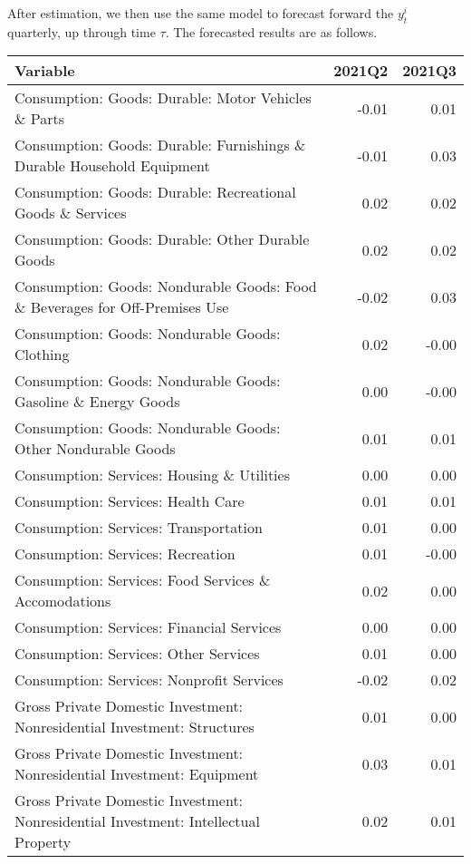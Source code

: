 \documentclass[11pt, letterpaper]{article}\usepackage[]{graphicx}\usepackage[]{color}
\begin{document}
After estimation, we then use the same model to forecast forward the $y^i_t$ quarterly, up through time $\tau$. 
The forecasted results are as follows.
\begin{table}[H]
\centering
\begingroup\scriptsize
\begin{tabular}{lrr}
  \hline
Variable & 2021Q2 & 2021Q3 \\ 
  \hline
Consumption: Goods: Durable: Motor Vehicles \& Parts & -0.01 & 0.01 \\ 
  Consumption: Goods: Durable: Furnishings \& Durable Household Equipment & -0.01 & 0.03 \\ 
  Consumption: Goods: Durable: Recreational Goods \& Services & 0.02 & 0.02 \\ 
  Consumption: Goods: Durable: Other Durable Goods & 0.02 & 0.02 \\ 
  Consumption: Goods: Nondurable Goods: Food \& Beverages for Off-Premises Use & -0.02 & 0.03 \\ 
  Consumption: Goods: Nondurable Goods: Clothing & 0.02 & -0.00 \\ 
  Consumption: Goods: Nondurable Goods: Gasoline \& Energy Goods & 0.00 & -0.00 \\ 
  Consumption: Goods: Nondurable Goods: Other Nondurable Goods & 0.01 & 0.01 \\ 
  Consumption: Services: Housing \& Utilities & 0.00 & 0.00 \\ 
  Consumption: Services: Health Care & 0.01 & 0.01 \\ 
  Consumption: Services: Transportation & 0.01 & 0.00 \\ 
  Consumption: Services: Recreation & 0.01 & -0.00 \\ 
  Consumption: Services: Food Services \& Accomodations & 0.02 & 0.00 \\ 
  Consumption: Services: Financial Services & 0.00 & 0.00 \\ 
  Consumption: Services: Other Services & 0.01 & 0.00 \\ 
  Consumption: Services: Nonprofit Services & -0.02 & 0.02 \\ 
  Gross Private Domestic Investment: Nonresidential Investment: Structures & 0.01 & 0.00 \\ 
  Gross Private Domestic Investment: Nonresidential Investment: Equipment & 0.03 & 0.01 \\ 
  Gross Private Domestic Investment: Nonresidential Investment: Intellectual Property & 0.02 & 0.01 \\ 

\end{tabular}
\end{table}
\end{document}
